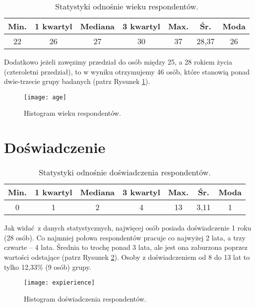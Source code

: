 \begin{table}[h!]
\begin{center}
\begin{tabular}{c c c c c c c}
Min. & 1 kwartyl & Mediana & 3 kwartyl & Max. & Śr. & Moda \\ \hline
22 & 26 & 27 & 30 & 37 & 28,37 & 26 \\
\end{tabular}
\end{center}
\caption{Statystyki odnośnie wieku respondentów.}
\label{tab:age-stats}
\end{table}

Dodatkowo jeżeli zawęzimy przedział do osób między 25, a 28 rokiem życia (czteroletni przedział), to w wyniku otrzymujemy 46 osób, które stanowią ponad dwie-trzecie grupy badanych (patrz Rysunek \ref{fig:age}).

\begin{figure}[h]
\begin{center}
\texttt{[image: age]}
\end{center}
\caption{Histogram wieku respondentów.}
\label{fig:age}
\end{figure}

\section{Doświadczenie}
\label{sec:group-exp}

\begin{table}[h!]
\begin{center}
\begin{tabular}{c c c c c c c}
Min. & 1 kwartyl & Mediana & 3 kwartyl & Max. & Śr. & Moda \\ \hline
0 & 1 & 2 & 4 & 13 & 3,11 & 1 \\
\end{tabular}
\end{center}
\caption{Statystyki odnośnie doświadczenia respondentów.}
\label{tab:expierience-stats}
\end{table}

Jak widać z danych statystycznych, najwięcej osób posiada doświadczenie 1 roku (28 osób). Co najmniej połowa respondentów pracuje co najwyżej 2 lata, a trzy czwarte -- 4 lata. Średnia to trochę ponad 3 lata, ale jest ona zaburzona poprzez wartości odstające (patrz Rysunek \ref{fig:expierience}). Osoby z doświadczeniem od 8 do 13 lat to tylko 12,33\% (9 osób) grupy.

\begin{figure}[h]
\begin{center}
\texttt{[image: expierience]}
\end{center}
\caption{Histogram doświadczenia respondentów.}
\label{fig:expierience}
\end{figure}

